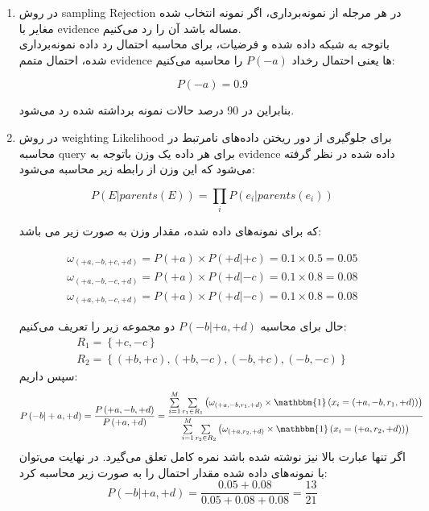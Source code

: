 \begin{enumerate} [label=(\alph*)]
	\item
	در روش sampling Rejection در هر مرجله از نمونه‌برداری، اگر نمونه انتخاب شده مغایر با evidence مساله باشد آن را رد می‌کنیم.\\
	باتوجه به شبکه داده شده و فرضیات، برای محاسبه احتمال رد داده نمونه‌برداری شده، احتمال متمم evidence ها یعنی احتمال رخداد $P\left( { - a} \right)$ را محاسبه می‌کنیم:
	
	$$
	P\left( { - a} \right) = 0.9
	$$
	
	بنابراین در 90 درصد حالات نمونه برداشته شده رد می‌شود.
	
	\item
	در روش weighting Likelihood برای جلوگیری از دور ریختن داده‌های نامرتبط در محاسبه query برای هر داده یک وزن باتوجه به evidence داده شده در نظر گرفته می‌شود که این وزن از رابطه زیر محاسبه می‌شود:
	
	$$
	P(E|parents(E)) = \prod\limits_i {P({e_i}|parents({e_i}))} 
	$$
	
	که برای نمونه‌های داده شده، مقدار وزن به صورت زیر می باشد:
	
	$$
	\begin{array}{l}
		{\omega _{( + a, - b, + c, + d)}} = P( + a) \times P( + d| + c) = 0.1 \times 0.5 = 0.05\\
		{\omega _{( + a, - b, - c, + d)}} = P( + a) \times P( + d| - c) = 0.1 \times 0.8 = 0.08\\
		{\omega _{( + a, + b, - c, + d)}} = P( + a) \times P( + d| - c) = 0.1 \times 0.8 = 0.08
	\end{array}
	$$
	
	حال برای محاسبه $P\left( { - b| + a, + d} \right)$ دو مجموعه زیر را تعریف می‌کنیم:
	$$
	\begin{array}{*{20}{l}}
		{{R_1} = \left\{ { + c, - c} \right\}}\\
		{{R_2} = \left\{ {( + b, + c),( + b, - c),( - b, + c),( - b, - c)} \right\}}
	\end{array}
	$$
	سپس داریم:
	$$
	P\left( { - b| + a, + d} \right) = \frac{{P\left( { + a, - b, + d} \right)}}{{P\left( { + a, + d} \right)}} = \frac{{\sum\limits_{i = 1}^M {\sum\limits_{{r_1} \in {R_1}} {\left( {{\omega _{( + a, - b,{r_1}, + d)}} \times \mathbbm{1}\left( {{x_i} = \left( { + a, - b,{r_1}, + d} \right)} \right)} \right)} } }}{{\sum\limits_{i = 1}^M {\sum\limits_{{r_2} \in {R_2}} {\left( {{\omega _{( + a,{r_2}, + d)}} \times \mathbbm{1}\left( {{x_i} = \left( { + a,{r_2}, + d} \right)} \right)} \right)} } }}
	$$
	اگر تنها عبارت بالا نیز نوشته شده باشد نمره کامل تعلق می‌گیرد. در نهایت می‌توان با نمونه‌های داده شده مقدار احتمال را به صورت زیر محاسبه کرد:
	$$
	P\left( { - b| + a, + d} \right) = \frac{{0.05 + 0.08}}{{0.05 + 0.08 + 0.08}} = \frac{{13}}{{21}}
	$$
	

\end{enumerate}
